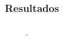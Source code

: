             \subsubsection*{Resultados}
                \begin{figure}
                    \begin{center}

                        \b
\end{center}
\end{figure}

